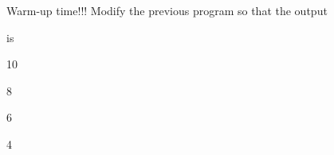 Warm-up time!!! Modify the previous program so that the output

is

\begin{console}

10

8

6

4

\end{console}

